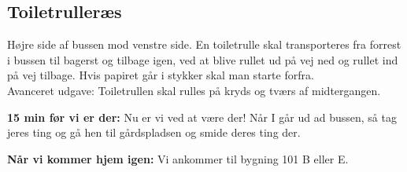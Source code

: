 \subsection*{Toiletrulleræs}
Højre side af bussen mod venstre side. En toiletrulle skal transporteres fra forrest i bussen til bagerst og tilbage igen, ved at blive rullet ud på vej ned og rullet ind på vej tilbage. Hvis papiret går i stykker skal man starte forfra. \\
Avanceret udgave: Toiletrullen skal rulles på kryds og tværs af midtergangen. 

\textbf{15 min før vi er der:} Nu er vi ved at være der! Når I går ud ad bussen, så tag jeres ting og gå hen til gårdspladsen og smide deres ting der.

\textbf{Når vi kommer hjem igen:} Vi ankommer til bygning 101 B eller E. 
